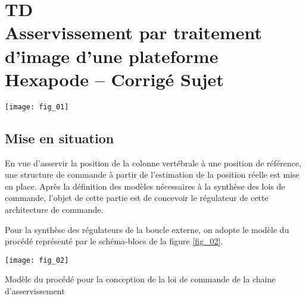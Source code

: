 \chapter*{TD  \\ 
Asservissement par traitement d’image d’une plateforme Hexapode -- \ifprof Corrigé \else Sujet \fi}


\iflivret {} \else
\ifprof  {} \else \fi
\fi
\setcounter{question}{0}

\begin{marginfigure}
\centering
\texttt{[image: fig\_01]}
\end{marginfigure}




\section*{Mise en situation}
\begin{obj}
En vue d’asservir la position de la colonne vertébrale à une position de référence, une structure de
commande à partir de l’estimation de la position réelle est mise en place. Après la définition des
modèles nécessaires à la synthèse des lois de commande, l’objet de cette partie est de concevoir le
régulateur de cette architecture de commande.

\end{obj}


Pour la synthèse des régulateurs de la boucle externe, on adopte le modèle du procédé représenté par le schéma-blocs de la figure \ref{fig_02}. 

\begin{marginfigure}
\texttt{[image: fig\_02]}
\caption{Modèle du procédé pour la conception de la loi de commande
de la chaine d’asservissement}
\label{fig_02}
\end{marginfigure}

